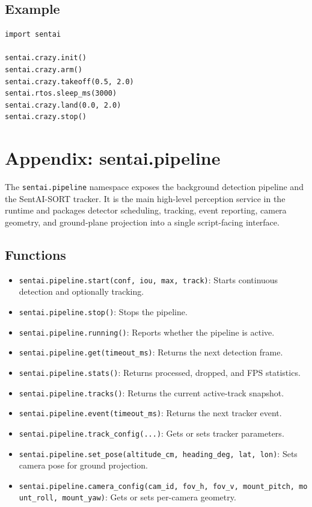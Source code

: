 \subsection{Example}\label{example-13}

\begin{verbatim}
import sentai

sentai.crazy.init()
sentai.crazy.arm()
sentai.crazy.takeoff(0.5, 2.0)
sentai.rtos.sleep_ms(3000)
sentai.crazy.land(0.0, 2.0)
sentai.crazy.stop()
\end{verbatim}

\section{Appendix: sentai.pipeline}\label{appendix-sentai.pipeline}

The \texttt{sentai.pipeline} namespace exposes the background detection
pipeline and the SentAI-SORT tracker. It is the main high-level
perception service in the runtime and packages detector scheduling,
tracking, event reporting, camera geometry, and ground-plane projection
into a single script-facing interface.

\subsection{Functions}\label{functions-14}

\begin{itemize}
\tightlist
\item
  \texttt{sentai.pipeline.start(conf,\ iou,\ max,\ track)}: Starts
  continuous detection and optionally tracking.
\item
  \texttt{sentai.pipeline.stop()}: Stops the pipeline.
\item
  \texttt{sentai.pipeline.running()}: Reports whether the pipeline is
  active.
\item
  \texttt{sentai.pipeline.get(timeout\_ms)}: Returns the next detection
  frame.
\item
  \texttt{sentai.pipeline.stats()}: Returns processed, dropped, and FPS
  statistics.
\item
  \texttt{sentai.pipeline.tracks()}: Returns the current active-track
  snapshot.
\item
  \texttt{sentai.pipeline.event(timeout\_ms)}: Returns the next tracker
  event.
\item
  \texttt{sentai.pipeline.track\_config(...)}: Gets or sets tracker
  parameters.
\item
  \texttt{sentai.pipeline.set\_pose(altitude\_cm,\ heading\_deg,\ lat,\ lon)}:
  Sets camera pose for ground projection.
\item
  \texttt{sentai.pipeline.camera\_config(cam\_id,\ fov\_h,\ fov\_v,\ mount\_pitch,\ mount\_roll,\ mount\_yaw)}:
  Gets or sets per-camera geometry.
\end{itemize}

